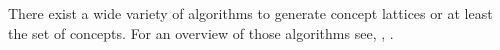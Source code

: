 



There exist a wide variety of algorithms to generate concept lattices or at least the set of concepts.
For an overview of those algorithms see, \eg, \cite{comparing-fca-algorithms:2010:kuznetov}.